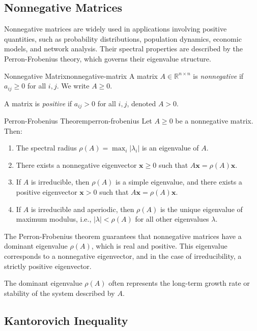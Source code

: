 \documentclass[../../main.tex]{subfiles}
\begin{document}
\subsection{Nonnegative Matrices}
Nonnegative matrices are widely used in applications involving positive quantities, such as probability distributions, population dynamics, economic models, and network analysis. Their spectral properties are described by the Perron-Frobenius theory, which governs their eigenvalue structure.

\begin{definition}{Nonnegative Matrix}{nonnegative-matrix}
    A matrix $A \in \mathbb{R}^{n \times n}$ is \emph{nonnegative} if $a_{ij} \geq 0$ for all $i, j$. We write $A \geq 0$.

    A matrix is \emph{positive} if $a_{ij} > 0$ for all $i, j$, denoted $A > 0$.
\end{definition}

\begin{theorem}{Perron-Frobenius Theorem}{perron-frobenius}
    Let $A \geq 0$ be a nonnegative matrix. Then:
    \begin{enumerate}
        \item The spectral radius $\rho(A) = \max_i |\lambda_i|$ is an eigenvalue of $A$.
        \item There exists a nonnegative eigenvector $\mathbf{x} \geq 0$ such that $A\mathbf{x} = \rho(A)\mathbf{x}$.
        \item If $A$ is irreducible, then $\rho(A)$ is a simple eigenvalue, and there exists a positive eigenvector $\mathbf{x} > 0$ such that $A\mathbf{x} = \rho(A)\mathbf{x}$.
        \item If $A$ is irreducible and aperiodic, then $\rho(A)$ is the unique eigenvalue of maximum modulus, i.e., $|\lambda| < \rho(A)$ for all other eigenvalues $\lambda$.
    \end{enumerate}
\end{theorem}

The Perron-Frobenius theorem guarantees that nonnegative matrices have a dominant eigenvalue $\rho(A)$, which is real and positive.
This eigenvalue corresponds to a nonnegative eigenvector, and in the case of irreducibility, a strictly positive eigenvector.

The dominant eigenvalue $\rho(A)$ often represents the long-term growth rate or stability of the system described by $A$.

\subsection{Kantorovich Inequality}\label{subsec:kantorovich-inequality}
\end{document}
